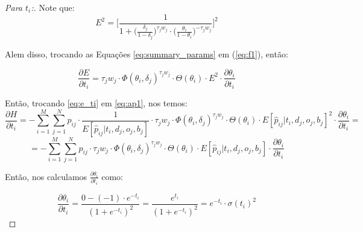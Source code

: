 \begin{proof}[Para $t_i$:]
    \noindent Note que:
    \begin{equation}
        E^{2} = \bigg[\frac{1}{1 + \big(\frac{\delta_j}{1 - \delta_j}\big)^{\tau_j w_j}\cdot \big(\frac{\theta_i}{1 - \theta_i}\big)^{-\tau_j w_j}}\bigg]^{2}
    \end{equation}
    
   \noindent  Alem disso, trocando as Equações \ref{eq:summary_params} em (\ref{eq:f1}), então:
    
    \begin{equation}
        \label{eq:e_ti}
        \frac{\partial E}{\partial t_i}  = \tau_j w_j \cdot \Phi(\theta_i, \delta_j)^{\tau_j w_j} \cdot \Theta(\theta_i) \cdot E^{2} \cdot \frac{\partial \theta_i}{\partial t_i}
    \end{equation}
    
    \noindent Então, trocando \ref{eq:e_ti} em \ref{eq:ap1}, nos temos:
    \begin{equation}
        \frac{\partial H}{\partial t_i} = - \sum_{i=1}^{M}\sum_{j=1}^{N} p_{ij}\cdot \frac{1}{E[\hat{p}_{ij} | t_i, d_j, o_j, b_j]} \cdot \tau_j w_j \cdot \Phi(\theta_i, \delta_j)^{\tau_j w_j} \cdot \Theta(\theta_i) \cdot E[\hat{p}_{ij} | t_i, d_j, o_j, b_j]^{2} \cdot \frac{\partial \theta_i}{\partial t_i} = 
    \end{equation}
    \begin{equation}
         = -\sum_{i=1}^{M}\sum_{j=1}^{N} p_{ij}\cdot \tau_j w_j \cdot \Phi(\theta_i, \delta_j)^{\tau_j w_j} \cdot \Theta(\theta_i) \cdot E[\hat{p}_{ij} | t_i, d_j, o_j, b_j]\cdot \frac{\partial \theta_i}{\partial t_i} 
    \end{equation}
    
    \noindent Então, nos calculamos $\frac{\partial \theta_i}{\partial t_i}$ como:
    
    \begin{equation}
        \frac{\partial \theta_i}{\partial t_i} = \frac{0 - (-1)\cdot e^{-t_i}}{(1 + e^{-t_i})^{2}} = \frac{e^{t_i}}{(1 + e^{-t_i})^{2}} = e^{-t_i}\cdot\sigma(t_i)^{2}
    \end{equation}
\end{proof}


